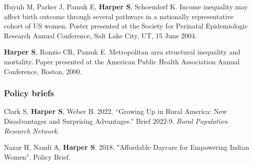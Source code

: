 \documentclass[
  letterpaper,
  DIV=11,
  numbers=noendperiod]{scrartcl}
\begin{document}
\begin{etaremune}
\item   Huynh M, Parker J, Pamuk E, \textbf{Harper S}, Schoendorf K. Income inequality may affect birth outcome through several pathways in a nationally representative cohort of US women.  Poster presented at the Society for Perinatal Epidemiologic Research Annual Conference, Salt Lake City, UT, 15 June 2004.

\item   \textbf{Harper S}, Ronzio CR, Pamuk E.  Metropolitan area structural inequality and mortality.  Paper presented at the American Public Health Association Annual Conference, Boston, 2000.

\end{etaremune}

\hypertarget{policy-briefs}{%
\subsubsection{Policy briefs}\label{policy-briefs}}

\begin{etaremune}

\item Clark S, \textbf{Harper S}, Weber B. 2022. “Growing Up in Rural America: New Disadvantages and Surprising Advantages.” Brief 2022-9. \emph{Rural Population Research Network}.

\item Nazar H, Nandi A, \textbf{Harper S}. 2018. "Affordable Daycare for Empowering Indian Women". Policy Brief.

\end{etaremune}
\end{document}

